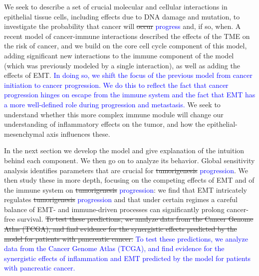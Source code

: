 \documentclass[11pt]{article}
\newcommand{\tcb} { \textcolor{blue} }
\begin{document}
We seek to describe a set of crucial molecular and cellular interactions in epithelial tissue cells, including effects due to DNA damage and mutation, to investigate the probability that cancer will \sout{occur} \tcb{progress} and, if so, when.
A recent model of cancer-immune interactions \cite{guo17_multiscale} described the effects of the TME on the risk of cancer, and we build on the core cell cycle component of this model, adding significant new interactions to the immune component of the model (which was previously modeled by a single interaction), as well as adding the effects of EMT.
\tcb{
In doing so, we shift the focus of the previous model from cancer initiation to cancer progression.
We do this to reflect the fact that cancer progression hinges on escape from the immune system and the fact that EMT has a more well-defined role during progression and metastasis.
}
We seek to understand whether this more complex immune module will change our understanding of inflammatory effects on the tumor, and how the epithelial-mesenchymal axis influences these.
\par 
In the next section we develop the model and give explanation of the intuition behind each component.
We then go on to analyze its behavior.
Global sensitivity analysis identifies parameters that are crucial for \sout{tumorigenesis} \tcb{progression}.
We then study these in more depth, focusing on the competing effects of EMT and of the immune system on \sout{tumorigenesis} \tcb{progression}: we find that EMT intricately regulates \sout{tumorigenesis} \tcb{progression} and that under certain regimes a careful balance of EMT- and immune-driven processes can significantly prolong cancer-free survival.
\sout{To test these predictions, we analyze data from the Cancer Genome Atlas (TCGA), and find evidence for the synergistic effects predicted by the model for patients with pancreatic cancer.}
\tcb{To test these predictions, we analyze data from the Cancer Genome Atlas (TCGA), and find evidence for the synergistic effects of inflammation and EMT predicted by the model for patients with pancreatic cancer.}

\end{document}
